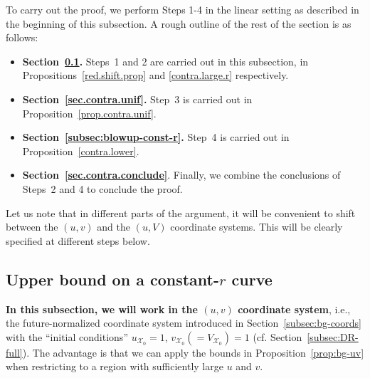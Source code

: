 \documentclass[10pt, reqno]{amsart}
\theoremstyle{definition}
\theoremstyle{remark}
\theoremstyle{conjecture}
\numberwithin{equation}{section}
\newcommand{\0}{\emptyset}
\newcommand{\calX}{\mathcal X}
\begin{document}
To carry out the proof, we perform Steps 1-4 in the linear setting \cite{LO.instab} as described in the beginning of this subsection. A rough outline of the rest of the section is as follows:
\begin{itemize}
\item \textbf{Section~\ref{subsec:blowup-pf}.} Steps~1 and 2 are carried out in this subsection, in Propositions~\ref{red.shift.prop} and \ref{contra.large.r} respectively.
\item \textbf{Section~\ref{sec.contra.unif}.} Step~3 is carried out in Proposition~\ref{prop.contra.unif}.
\item \textbf{Section~\ref{subsec:blowup-const-r}.} Step~4 is carried out in Proposition~\ref{contra.lower}.
\item \textbf{Section~\ref{sec.contra.conclude}}. Finally, we combine the conclusions of Steps~2 and 4 to conclude the proof.
\end{itemize}

Let us note that in different parts of the argument, it will be convenient to shift between the $(u,v)$ and the $(u,V)$ coordinate systems. This will be clearly specified at different steps below.

\subsection{Upper bound on a constant-$r$ curve}	\label{subsec:blowup-pf}


\textbf{In this subsection, we will work in the $(u,v)$ coordinate system}, i.e., the future-normalized coordinate system introduced in Section~\ref{subsec:bg-coords} with the ``initial conditions'' $u_{\calX_0}=1$, $v_{\calX_0}(=V_{\calX_0})=1$ (cf. Section~\ref{subsec:DR-full}). The advantage is that we can apply the bounds in Proposition~\ref{prop:bg-uv} when restricting to a region with sufficiently large $u$ and $v$.
\end{document}
